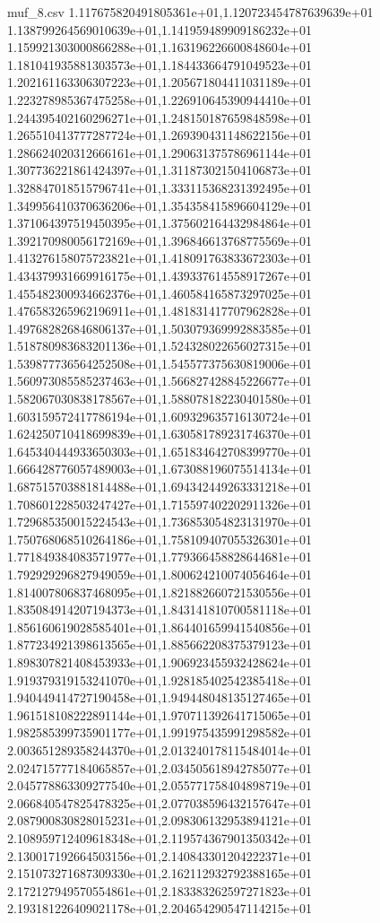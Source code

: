 \begin{filecontents*}{muf_8.csv}
1.117675820491805361e+01,1.120723454787639639e+01
1.138799264569010639e+01,1.141959489909186232e+01
1.159921303000866288e+01,1.163196226600848604e+01
1.181041935881303573e+01,1.184433664791049523e+01
1.202161163306307223e+01,1.205671804411031189e+01
1.223278985367475258e+01,1.226910645390944410e+01
1.244395402160296271e+01,1.248150187659848598e+01
1.265510413777287724e+01,1.269390431148622156e+01
1.286624020312666161e+01,1.290631375786961144e+01
1.307736221861424397e+01,1.311873021504106873e+01
1.328847018515796741e+01,1.333115368231392495e+01
1.349956410370636206e+01,1.354358415896604129e+01
1.371064397519450395e+01,1.375602164432984864e+01
1.392170980056172169e+01,1.396846613768775569e+01
1.413276158075723821e+01,1.418091763833672303e+01
1.434379931669916175e+01,1.439337614558917267e+01
1.455482300934662376e+01,1.460584165873297025e+01
1.476583265962196911e+01,1.481831417707962828e+01
1.497682826846806137e+01,1.503079369992883585e+01
1.518780983683201136e+01,1.524328022656027315e+01
1.539877736564252508e+01,1.545577375630819006e+01
1.560973085585237463e+01,1.566827428845226677e+01
1.582067030838178567e+01,1.588078182230401580e+01
1.603159572417786194e+01,1.609329635716130724e+01
1.624250710418699839e+01,1.630581789231746370e+01
1.645340444933650303e+01,1.651834642708399770e+01
1.666428776057489003e+01,1.673088196075514134e+01
1.687515703881814488e+01,1.694342449263331218e+01
1.708601228503247427e+01,1.715597402202911326e+01
1.729685350015224543e+01,1.736853054823131970e+01
1.750768068510264186e+01,1.758109407055326301e+01
1.771849384083571977e+01,1.779366458828644681e+01
1.792929296827949059e+01,1.800624210074056464e+01
1.814007806837468095e+01,1.821882660721530556e+01
1.835084914207194373e+01,1.843141810700581118e+01
1.856160619028585401e+01,1.864401659941540856e+01
1.877234921398613565e+01,1.885662208375379123e+01
1.898307821408453933e+01,1.906923455932428624e+01
1.919379319153241070e+01,1.928185402542385418e+01
1.940449414727190458e+01,1.949448048135127465e+01
1.961518108222891144e+01,1.970711392641715065e+01
1.982585399735901177e+01,1.991975435991298582e+01
2.003651289358244370e+01,2.013240178115484014e+01
2.024715777184065857e+01,2.034505618942785077e+01
2.045778863309277540e+01,2.055771758404898719e+01
2.066840547825478325e+01,2.077038596432157647e+01
2.087900830828015231e+01,2.098306132953894121e+01
2.108959712409618348e+01,2.119574367901350342e+01
2.130017192664503156e+01,2.140843301204222371e+01
2.151073271687309330e+01,2.162112932792388165e+01
2.172127949570554861e+01,2.183383262597271823e+01
2.193181226409021178e+01,2.204654290547114215e+01

\end{filecontents*}
